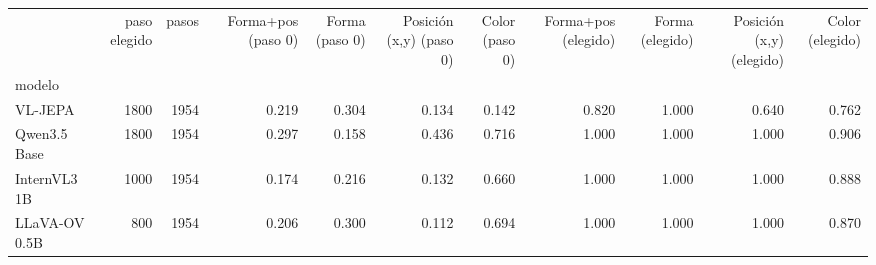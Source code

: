 \begin{tabular}{lrrrrrrrrrr}
\toprule
 & paso elegido & pasos & Forma+pos (paso 0) & Forma (paso 0) & Posición (x,y) (paso 0) & Color (paso 0) & Forma+pos (elegido) & Forma (elegido) & Posición (x,y) (elegido) & Color (elegido) \\
modelo &  &  &  &  &  &  &  &  &  &  \\
\midrule
VL-JEPA & 1800 & 1954 & 0.219 & 0.304 & 0.134 & 0.142 & 0.820 & 1.000 & 0.640 & 0.762 \\
Qwen3.5 Base & 1800 & 1954 & 0.297 & 0.158 & 0.436 & 0.716 & 1.000 & 1.000 & 1.000 & 0.906 \\
InternVL3 1B & 1000 & 1954 & 0.174 & 0.216 & 0.132 & 0.660 & 1.000 & 1.000 & 1.000 & 0.888 \\
LLaVA-OV 0.5B & 800 & 1954 & 0.206 & 0.300 & 0.112 & 0.694 & 1.000 & 1.000 & 1.000 & 0.870 \\
\bottomrule
\end{tabular}
